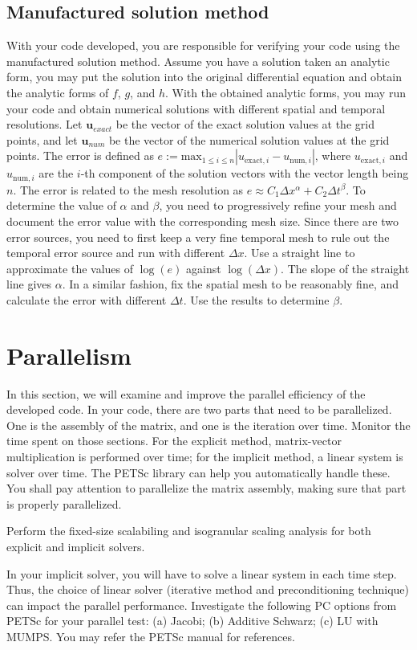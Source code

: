 \documentclass[12pt]{article}
\begin{document}
\subsection{Manufactured solution method}
With your code developed, you are responsible for verifying your code using the manufactured solution method. Assume you have a solution taken an analytic form, you may put the solution into the original differential equation and obtain the analytic forms of $f$, $g$, and $h$. With the obtained analytic forms, you may run your code and obtain numerical solutions with different spatial and temporal resolutions. Let $\bm u_{exact}$ be the vector of the exact solution values at the grid points, and let $\bm u_{num}$ be the vector of the numerical solution values at the grid points. The error is defined as $e := \mathrm{max}_{1 \leq i \leq n} |  u_{\mathrm{exact}, i} -  u_{\mathrm{num}, i}| $, where $u_{\mathrm{exact}, i}$ and $u_{\mathrm{num}, i}$ are the $i$-th component of the solution vectors with the vector length being $n$. The error is related to the mesh resolution as $e \approx C_1 \Delta x^{\alpha} + C_2 \Delta t^{\beta}$. To determine the value of $\alpha$ and $\beta$, you need to progressively refine your mesh and document the error value with the corresponding mesh size. Since there are two error sources, you need to first keep a very fine temporal mesh to rule out the temporal error source and run with different $\Delta x$. Use a straight line to approximate the values of $\log(e)$ against $\log(\Delta x)$. The slope of the straight line gives $\alpha$. In a similar fashion, fix the spatial mesh to be reasonably fine, and calculate the error with different $\Delta t$. Use the results to determine $\beta$.

\section{Parallelism}
In this section, we will examine and improve the parallel efficiency of the developed code. In your code, there are two parts that need to be parallelized. One is the assembly of the matrix, and one is the iteration over time. Monitor the time spent on those sections. For the explicit method, matrix-vector multiplication is performed over time; for the implicit method, a linear system is solver over time. The PETSc library can help you automatically handle these. You shall pay attention to parallelize the matrix assembly, making sure that part is properly parallelized.

Perform the fixed-size scalabiling and isogranular scaling analysis for both explicit and implicit solvers.

In your implicit solver, you will have to solve a linear system in each time step. Thus, the choice of linear solver (iterative method and preconditioning technique) can impact the parallel performance. Investigate the following PC options from PETSc for your parallel test: (a) Jacobi; (b) Additive Schwarz; (c) LU with MUMPS. You may refer the PETSc manual for references.
\end{document}
